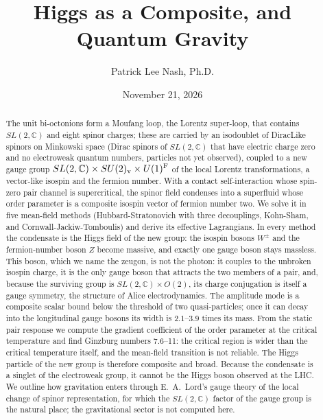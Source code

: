 \documentclass[aps,prd,twocolumn,superscriptaddress,nofootinbib,floatfix,longbibliography]{revtex4-2}
\begin{document}
\title{Higgs as a Composite, and Quantum Gravity}

\author{Patrick Lee Nash, Ph.D.}

\date{November 21, 2026}

\begin{abstract}
The unit bi-octonions form a Moufang loop, the Lorentz super-loop, that contains $SL(2,\mathbb C)$ and eight spinor
charges; these are carried by an isodoublet of DiracLike spinors on Minkowski space (Dirac spinors of $SL(2,\mathbb C)$
that have electric charge zero and no electroweak quantum numbers, particles not yet observed), coupled to a new gauge
group $SL(2,\mathbb C)\times SU(2)_{\rm v}\times U(1)^{\rm F}$ of the local Lorentz transformations, a vector-like isospin and
the fermion number. With a contact self-interaction whose spin-zero pair channel is supercritical, the spinor field
condenses into a superfluid whose order parameter is a composite isospin vector of fermion number two. We solve it in
five mean-field methods (Hubbard-Stratonovich with three decouplings, Kohn-Sham, and Cornwall-Jackiw-Tomboulis) and
derive its effective Lagrangians. In every method the condensate is the Higgs field of the new group: the isospin bosons
$W^\pm$ and the fermion-number boson $Z$ become massive, and exactly one gauge boson stays massless. This boson, which we
name the zeugon, is not the photon: it couples to the unbroken isospin charge, it is the only gauge boson that attracts
the two members of a pair, and, because the surviving group is $SL(2,\mathbb C)\times O(2)$, its charge conjugation is
itself a gauge symmetry, the structure of Alice electrodynamics. The amplitude mode is a composite scalar bound below
the threshold of two quasi-particles; once it can decay into the longitudinal gauge bosons its width is $2.1\mbox{--}3.9$
times its mass. From the static pair response we compute the gradient coefficient of the order parameter at the critical
temperature and find Ginzburg numbers 7.6\mbox{--}11: the critical region is wider than the critical temperature itself,
and the mean-field transition is not reliable. The Higgs particle of the new group is therefore composite and broad.
Because the condensate is a singlet of the electroweak group, it cannot be the Higgs boson observed at the LHC. We outline
how gravitation enters through E.~A.~Lord's gauge theory of the local change of spinor representation, for which the
$SL(2,\mathbb C)$ factor of the gauge group is the natural place; the gravitational sector is not computed here.
\end{abstract}
\end{document}
